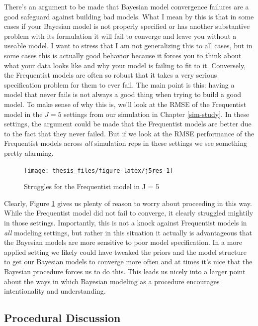 \documentclass[12pt,twoside]{reedthesis}
\begin{document}
There's an argument to be made that Bayesian model convergence failures are a good safeguard against building bad models. What I mean by this is that in some cases if your Bayesian model is not properly specified or has another substantive problem with its formulation it will fail to converge and leave you without a useable model. I want to stress that I am not generalizing this to all cases, but in some cases this is actually good behavior because it forces you to think about what your data looks like and why your model is failing to fit to it. Conversely, the Frequentist models are often so robust that it takes a very serious specification problem for them to ever fail. The main point is this: having a model that never fails is not always a good thing when trying to build a good model. To make sense of why this is, we'll look at the RMSE of the Frequentist model in the \(J = 5\) settings from our simulation in Chapter \ref{sim-study}. In these settings, the argument could be made that the Frequentist models are better due to the fact that they never failed. But if we look at the RMSE performance of the Frequentist models across \emph{all} simulation reps in these settings we see something pretty alarming.
\begin{figure}

{\centering \texttt{[image: thesis\_files/figure-latex/j5res-1]} 

}

\caption{Struggles for the Frequentist model in J = 5}\label{fig:j5res}
\end{figure}
Clearly, Figure \ref{fig:j5res} gives us plenty of reason to worry about proceeding in this way. While the Frequentist model did not fail to converge, it clearly struggled mightily in those settings. Importantly, this is not a knock against Frequentist models in \emph{all} modeling settings, but rather in this situation it actually is advantageous that the Bayesian models are more sensitive to poor model specification. In a more applied setting we likely could have tweaked the priors and the model structure to get our Bayesian models to converge more often and at times it's nice that the Bayesian procedure forces us to do this. This leads us nicely into a larger point about the ways in which Bayesian modeling as a procedure encourages intentionality and understanding.

\hypertarget{procedural-discussion}{%
\subsection{Procedural Discussion}\label{procedural-discussion}}
\end{document}
